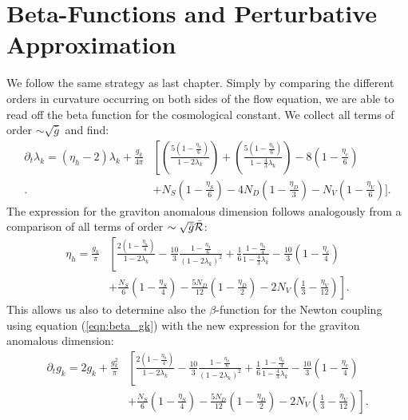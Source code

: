 \section{Beta-Functions and Perturbative Approximation}
We follow the same strategy as last chapter. Simply by comparing the different orders in curvature occurring on both sides of the flow equation, we are able to read off the beta function for the cosmological constant. We collect all terms of order $\sim \sqrt{\bar{g}}$ and find:
\begin{equation}
\begin{aligned}
	\partial_t\lambda_k = \left(\eta_h - 2\right)\lambda_k + \frac{g_k}{4\pi}&\left[\left(\frac{5\left(1-\frac{\eta_h}{6}\right)}{1-2\lambda_k}\right) + \left(\frac{5\left(1-\frac{\eta_h}{6}\right)}{1-\frac{4}{3}\lambda_k}\right) - 8\left(1-\frac{\eta_c}{6}\right)\right. \\[10pt] 
	\Biggl. &+ N_S\left(1-\frac{\eta_S}{6}\right) - 4N_D\left(1-\frac{\eta_D}{3}\right) - N_V\left(1- \frac{\eta_V}{6}\right)\Biggr].
\end{aligned}
\end{equation}
The expression for the graviton anomalous dimension follows analogously from a comparison of all terms of order $\sim\sqrt{\bar{g}}\bar{\mathcal{R}}$:
\begin{equation}
\begin{aligned}
	\eta_h = \frac{g_k}{\pi}&\left[\frac{2\left(1-\frac{\eta_h}{4}\right)}{1-2\lambda_k} -\frac{10}{3}\frac{1-{\frac{\eta_h}{6}}}{\left(1-2\lambda_k\right)^2}+\frac{1}{6}\frac{1-\frac{\eta_h}{4}}{1-\frac{4}{3}\lambda_k}-\frac{10}{3}\left(1-\frac{\eta_c}{4}\right)\right.\\[10pt]
	 &\left. +\frac{N_S}{6}\left(1-\frac{\eta_S}{4}\right) - \frac{5N_D}{12}\left(1-\frac{\eta_D}{2}\right)-2N_V\left(\frac{1}{3}-\frac{\eta_V}{12}\right)\right].
\end{aligned}
\end{equation}
This allows us also to determine also the $\beta$-function for the Newton coupling using equation (\ref{eqn:beta_gk}) with the new expression for the graviton anomalous dimension:
\begin{equation}
	\begin{aligned}
		\partial_tg_k = 2g_k +\frac{g_k^2}{\pi}&\left[\frac{2\left(1-\frac{\eta_h}{4}\right)}{1-2\lambda_k} -\frac{10}{3}\frac{1-{\frac{\eta_h}{6}}}{\left(1-2\lambda_k\right)^2}+\frac{1}{6}\frac{1-\frac{\eta_h}{4}}{1-\frac{4}{3}\lambda_k}-\frac{10}{3}\left(1-\frac{\eta_c}{4}\right)\right.\\[10pt]
	 &\left. +\frac{N_S}{6}\left(1-\frac{\eta_S}{4}\right) - \frac{5N_D}{12}\left(1-\frac{\eta_D}{2}\right)-2N_V\left(\frac{1}{3}-\frac{\eta_V}{12}\right)\right].
	\end{aligned}
\end{equation}
